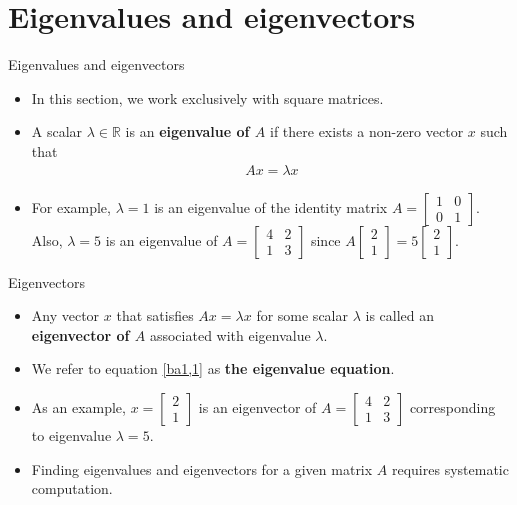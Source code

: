 \section{Eigenvalues and eigenvectors}
\begin{frame}{Eigenvalues and eigenvectors}
\begin{itemize}
    \item In this section, we work exclusively with square matrices.
    \item A scalar $\lambda\in \mathbb{R}$ is an \textbf{eigenvalue of $A$} if there exists a non-zero vector $x$ such that \begin{align}
        Ax = \lambda x \label{ba1,1}
    \end{align}
    \item For example, $\lambda = 1$ is an eigenvalue of the identity matrix $A = \begin{bmatrix}
        1 & 0 \\
        0 & 1
    \end{bmatrix}$. Also, $\lambda = 5$ is an eigenvalue of $A= \begin{bmatrix}
        4 & 2\\
        1 & 3
    \end{bmatrix}$ since $A\begin{bmatrix}
        2\\1
    \end{bmatrix}= 5 \begin{bmatrix}
        2\\1
    \end{bmatrix}$.
    
\end{itemize}
\end{frame}
\begin{frame}{Eigenvectors}
\begin{itemize}
   \item Any vector $x$ that satisfies $Ax = \lambda x$ for some scalar $\lambda$ is called an \textbf{eigenvector of $A$} associated with eigenvalue $\lambda$.
    \item We refer to equation \ref{ba1,1} as \textbf{the eigenvalue equation}.
    \item As an example, $x= \begin{bmatrix}
        2 \\ 1
    \end{bmatrix}$ is an eigenvector of $A= \begin{bmatrix}
        4 & 2\\
        1 & 3
    \end{bmatrix}$ corresponding to eigenvalue $\lambda = 5$.
    \item Finding eigenvalues and eigenvectors for a given matrix $A$ requires systematic computation.
\end{itemize}
    
\end{frame}
